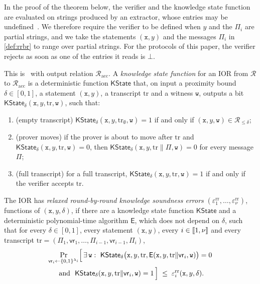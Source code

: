 In the proof of the theorem below, the verifier and the knowledge state function are evaluated on strings produced by an extractor, whose entries may be undefined~\cite[Constructions~11.8 and~11.9]{CDHZ25}.
We therefore require the verifier to be defined when $y$ and the $\Pi_i$ are partial strings, and we take the statements $(\mathtt{x}, y)$ and the messages $\Pi_i$ in \cref{def:rrbr} to range over partial strings.
For the protocols of this paper, the verifier rejects as soon as one of the entries it reads is $\bot$.

\begin{definition}\label{def:rrbr}
This is~\cite[Definitions~3.5 and~3.6]{CDHZ25} with output relation $\mathcal{R}_{\mathrm{acc}}$.
A \emph{knowledge state function} for an IOR from $\mathcal{R}$ to $\mathcal{R}_{\mathrm{acc}}$ is a deterministic function $\mathsf{KState}$ that, on input a proximity bound $\delta \in [0,1]$, a statement $(\mathtt{x}, y)$, a transcript $\mathrm{tr}$ and a witness $\mathtt{w}$, outputs a bit $\mathsf{KState}_\delta(\mathtt{x}, y, \mathrm{tr}, \mathtt{w})$, such that:
\begin{enumerate}
  \item (empty transcript) $\mathsf{KState}_\delta(\mathtt{x}, y, \mathrm{tr}_\emptyset, \mathtt{w}) = 1$ if and only if $(\mathtt{x}, y, \mathtt{w}) \in \mathcal{R}_{\le\delta}$;
  \item (prover moves) if the prover is about to move after $\mathrm{tr}$ and $\mathsf{KState}_\delta(\mathtt{x}, y, \mathrm{tr}, \mathtt{w}) = 0$, then $\mathsf{KState}_\delta(\mathtt{x}, y, \mathrm{tr} \| \Pi, \mathtt{w}) = 0$ for every message $\Pi$;
  \item (full transcript) for a full transcript, $\mathsf{KState}_\delta(\mathtt{x}, y, \mathrm{tr}, \mathtt{w}) = 1$ if and only if the verifier accepts $\mathrm{tr}$.
\end{enumerate}
The IOR has \emph{relaxed round-by-round knowledge soundness errors} $(\varepsilon^{\mathrm{rr}}_1, \dots, \varepsilon^{\mathrm{rr}}_\nu)$, functions of $(\mathtt{x}, y, \delta)$, if there are a knowledge state function $\mathsf{KState}$ and a deterministic polynomial-time algorithm $\mathsf{E}$, which does not depend on $\delta$, such that for every $\delta \in [0,1]$, every statement $(\mathtt{x}, y)$, every $i \in \llbracket 1, \nu \rrbracket$ and every transcript $\mathrm{tr} = (\Pi_1, \mathsf{vr}_1, \dots, \Pi_{i-1}, \mathsf{vr}_{i-1}, \Pi_i)$,
\begin{multline*}
  \Pr_{\mathsf{vr}_i \leftarrow \{0,1\}^{\lambda_i}}\Bigl[\, \exists\, \mathtt{w} :\ \mathsf{KState}_\delta\bigl(\mathtt{x}, y, \mathrm{tr}, \mathsf{E}(\mathtt{x}, y, \mathrm{tr}\|\mathsf{vr}_i, \mathtt{w})\bigr) = 0 \\
  \text{ and } \ \mathsf{KState}_\delta(\mathtt{x}, y, \mathrm{tr}\|\mathsf{vr}_i, \mathtt{w}) = 1 \,\Bigr] \;\le\; \varepsilon^{\mathrm{rr}}_i(\mathtt{x}, y, \delta).
\end{multline*}
\end{definition}

